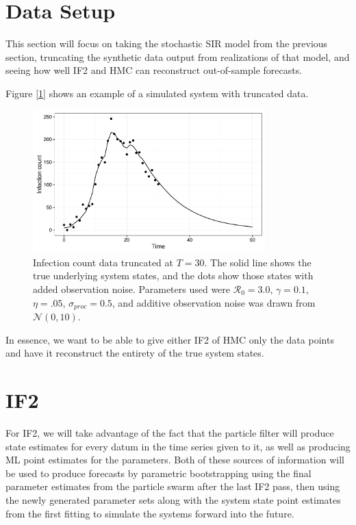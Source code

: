 

\section{Data Setup}

	This section will focus on taking the stochastic SIR model from the previous section, truncating the synthetic data output from realizations of that model, and seeing how well IF2 and HMC can reconstruct out-of-sample forecasts.

	Figure [\ref{sc2dataplot}] shows an example of a simulated system with truncated data.

	\begin{figure}
        \centering
        \captionsetup{width=.8\linewidth}
        \includegraphics[width=0.8\textwidth]{./images/dataplot.pdf}
        \caption{Infection count data truncated at $T = 30$. The solid line shows the true underlying system states, and the dots show those states with added observation noise. Parameters used were $\mathcal{R}_0 = 3.0$, $\gamma = 0.1$, $\eta = .05$, $\sigma_{proc} = 0.5$, and additive observation noise was drawn from $\mathcal{N}(0,10)$. \label{sc2dataplot}}
    \end{figure}

	In essence, we want to be able to give either IF2 of HMC only the data points and have it reconstruct the entirety of the true system states.
    

\section{IF2}

	For IF2, we will take advantage of the fact that the particle filter will produce state estimates for every datum in the time series given to it, as well as producing ML point estimates for the parameters. Both of these sources of information will be used to produce forecasts by parametric bootstrapping using the final parameter estimates from the particle swarm after the last IF2 pass, then using the newly generated parameter sets along with the system state point estimates from the first fitting to simulate the systems forward into the future.

